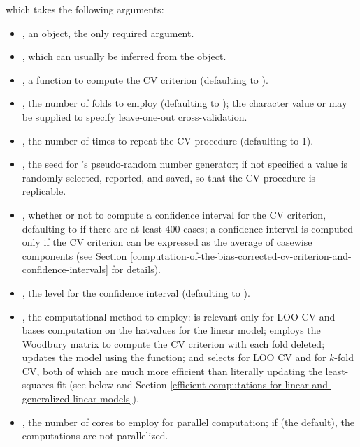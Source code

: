 \documentclass[
]{jss}
\begin{document}
which takes the following arguments:

\begin{itemize}
\item
  , an  object, the only required argument.
\item
  , which can usually be inferred from the 
  object.
\item
  , a function to compute the CV criterion (defaulting
  to ).
\item
  , the number of folds to employ (defaulting to ); the
  character value  or  may be supplied to specify
  leave-one-out cross-validation.
\item
  , the number of times to repeat the CV procedure
  (defaulting to 1).
\item
  , the seed for 's pseudo-random number
  generator; if not specified a value is randomly selected, reported,
  and saved, so that the CV procedure is replicable.
\item
  , whether or not to compute a confidence interval for
  the CV criterion, defaulting to  if there are at least 400
  cases; a confidence interval is computed only if the CV criterion can
  be expressed as the average of casewise components (see Section
  \ref{computation-of-the-bias-corrected-cv-criterion-and-confidence-intervals}
  for details).
\item
  , the level for the confidence interval (defaulting to
  ).
\item
  , the computational method to employ: 
  is relevant only for LOO CV and bases computation on the hatvalues for
  the linear model;  employs the Woodbury matrix to
  compute the CV criterion with each fold deleted; 
  updates the model using the  function; and
   selects  for LOO CV and
   for \(k\)-fold CV, both of which are much more
  efficient than literally updating the least-squares fit (see below and
  Section
  \ref{efficient-computations-for-linear-and-generalized-linear-models}).
\item
  , the number of cores to employ for parallel computation;
  if  (the default), the computations are not
  parallelized.
\end{itemize}
\end{document}

